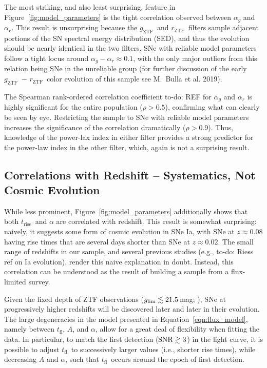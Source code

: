 \documentclass[twocolumn]{./aastex63}
\newcommand{\todo}[1]{{\color{magenta} to-do: {#1}}}
\newcommand{\rztf}{$r_\mathrm{ZTF}$}
\newcommand{\gztf}{$g_\mathrm{ZTF}$}
\newcommand{\tfl}{$t_\mathrm{fl}$}
\newcommand{\trise}{$t_\mathrm{rise}$}
\begin{document}
The most striking, and also least surprising, feature in
Figure~\ref{fig:model_parameters} is the tight correlation observed between
$\alpha_g$ and $\alpha_r$. This result is unsurprising because the \gztf\
and \rztf\ filters sample adjacent portions of the SN spectral energy
distribution (SED), and thus the evolution should be nearly identical in the
two filters. SNe with reliable model parameters follow a tight locus around
$\alpha_g - \alpha_r \approx 0.1$, with the only major outliers from this
relation being SNe in the unreliable group (for further discussion of the
early \gztf\ $-$ \rztf\ color evolution of this sample see M.~Bulla et al.
2019).

The Spearman rank-ordered correlation coefficient \todo{REF} for $\alpha_g$
and $\alpha_r$ is highly significant for the entire population ($\rho >
0.5$), confirming what can clearly be seen by eye. Restricting the sample to
SNe with reliable model parameters increases the significance of the
correlation dramatically ($\rho > 0.9$). Thus, knowledge of the power-lax
index in either filter provides a strong predictor for the power-law index
in the other filter, which, again is not a surprising result.

\subsection{Correlations with Redshift -- Systematics, Not Cosmic Evolution}\label{sec:redshift_correlations}

While less prominent, Figure~\ref{fig:model_parameters} additionally shows
that both \trise\ and $\alpha$ are correlated with redshift. This result is
somewhat surprising: naively, it suggests some form of cosmic evolution in SNe
Ia, with SNe at $z \approx 0.08$ having rise times that are several days
shorter than SNe at $z \approx 0.02$. The small range of redshifts in our
sample, and several previous studies (e.g., \todo{Riess ref on Ia evolution}),
render this naive explanation in doubt. Instead, this correlation can be
understood as the result of building a sample from a flux-limited survey.

Given the fixed depth of ZTF observations ($g_\mathrm{lim} \lesssim 21.5$\,mag;
\citealt{Masci19,Bellm19}), SNe at progressively higher redshifts will be
discovered later and later in their evolution. The large degeneracies in the
model presented in Equation~\ref{eqn:flux_model}, namely between \tfl, $A$,
and $\alpha$, allow for a great deal of flexibility when fitting the data. In
particular, to match the first detection ($\mathrm{SNR} \gtrsim 3$) in the light
curve, it is possible to adjust \tfl\ to successively larger values (i.e.,
shorter rise times), while decreasing $A$ and $\alpha$, such that \tfl\ occurs
around the epoch of first detection. 
\end{document}
